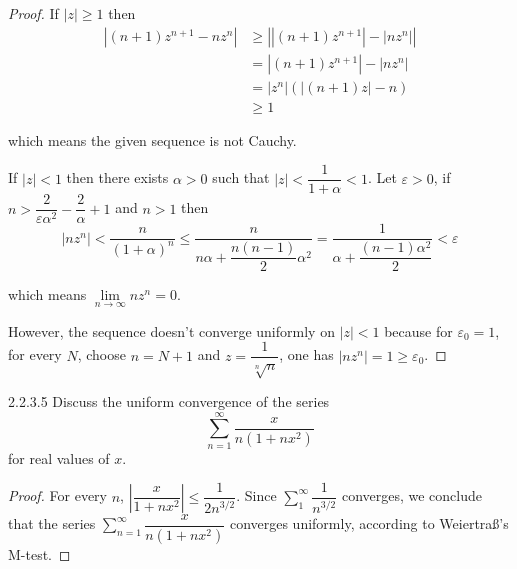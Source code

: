 \begin{proof}
	If \( \left\vert z \right\vert \ge 1 \) then
	\begingroup
	\allowdisplaybreaks%
	\begin{align*}
		\left\vert (n + 1)z^{n+1} - nz^{n} \right\vert & \ge \left\vert \left\vert (n + 1)z^{n+1}\right\vert - \left\vert nz^{n} \right\vert \right\vert \\
		                                               & = \left\vert (n + 1)z^{n+1}\right\vert - \left\vert nz^{n} \right\vert                          \\
		                                               & = \left\vert z^{n}\right\vert (\left\vert (n + 1)z\right\vert - n)                              \\
		                                               & \ge 1
	\end{align*}
	\endgroup

	which means the given sequence is not Cauchy.

	If  \( \left\vert z \right\vert < 1 \) then there exists \( \alpha > 0 \) such that \( \left\vert z \right\vert < \dfrac{1}{1 + \alpha} < 1 \). Let \( \varepsilon > 0 \), if \( n > \dfrac{2}{\varepsilon\alpha^{2}} - \dfrac{2}{\alpha} + 1 \) and \( n > 1 \)  then
	\[
		\left\vert nz^{n} \right\vert < \dfrac{n}{{(1 + \alpha)}^{n}} \le \dfrac{n}{n\alpha + \dfrac{n(n-1)}{2}\alpha^{2}} = \dfrac{1}{\alpha + \dfrac{(n - 1)\alpha^{2}}{2}} < \varepsilon
	\]

	which means \( \lim\limits_{n\to\infty} nz^{n} = 0 \).

	However, the sequence doesn't converge uniformly on \( \left\vert z \right\vert < 1 \) because for \( \varepsilon_{0} = 1 \), for every \( N \), choose \( n = N + 1 \) and \( z = \dfrac{1}{\sqrt[n]{n}} \), one has \( \left\vert nz^{n} \right\vert = 1 \ge \varepsilon_{0} \).
\end{proof}

\begin{problem}{2.2.3.5}
Discuss the uniform convergence of the series
\[
	\sum_{n=1}^{\infty} \frac{x}{n(1+nx^{2})}
\]
for real values of \( x \).
\end{problem}

\begin{proof}
	For every \( n \), \( \left\vert\dfrac{x}{1 + nx^{2}}\right\vert \le \dfrac{1}{2n^{3/2}} \). Since \( \sum_{1}^{\infty} \dfrac{1}{n^{3/2}} \) converges, we conclude that the series \( \sum_{n=1}^{\infty} \dfrac{x}{n(1 + nx^{2})} \) converges uniformly, according to Weiertra\ss's M-test.
\end{proof}

